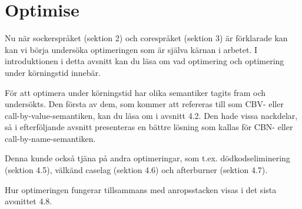 \documentclass[Rapport]{subfiles}
\begin{document}
\section{Optimise}
\label{sec:Optimise}

\overviewOptimise

Nu när sockerspråket (sektion 2) och corespråket (sektion 3) är förklarade
kan kan vi börja undersöka optimeringen som är själva kärnan i arbetet.
I introduktionen i detta avsnitt kan du läsa om vad optimering och 
optimering under körningstid innebär. 

För att optimera under körningstid har olika semantiker tagits fram och undersökts.   
Den första av dem, som kommer att refereras till som CBV- eller call-by-value-semantiken, 
kan du läsa om i avsnitt 4.2. Den hade vissa nackdelar, så i 
efterföljande avsnitt presenteras en bättre lösning som kallas för CBN- eller call-by-name-semantiken.

Denna kunde också tjäna på andra optimeringar, som t.ex.
dödkodseliminering (sektion 4.5), 
välkänd caselag (sektion 4.6) och 
afterburner (sektion 4.7).

Hur optimeringen fungerar tillsammans med anropsstacken visas i det sista avsnittet 4.8.


\end{document}
